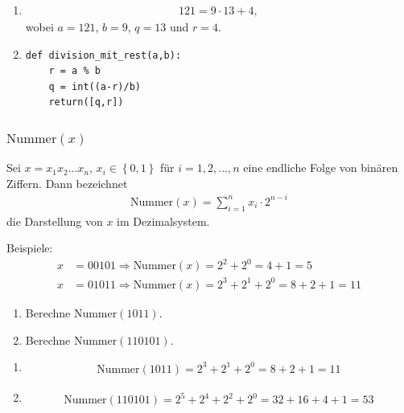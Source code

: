 \begin{Answer}%

\begin{enumerate}[label=(\alph*)]
    \item \begin{align*}
    121 = 9\cdot 13 + 4,
\end{align*}
wobei $a = 121$, $b = 9$, $q = 13$ und $r = 4$.
    \item \begin{verbatim}
def division_mit_rest(a,b):
    r = a % b
    q = int((a-r)/b)
    return([q,r])
\end{verbatim}
\end{enumerate}
\end{Answer}


\subsubsection{$\text{Nummer}(x)$}
Sei $x=x_1x_2...x_n$, $x_i\in\left\{0,1\right\}$ für $i=1,2,...,n$ eine endliche Folge von binären Ziffern. Dann bezeichnet 
\begin{align}
    \text{Nummer}(x)=\displaystyle\sum_{i=1}^n x_i\cdot 2^{n-i}
\end{align}
die Darstellung von $x$ im Dezimalsystem.

Beispiele:
\begin{align*}
    x &= 00101 \Rightarrow \text{Nummer}(x) = 2^2 + 2^0 = 4 + 1 = 5\\
    x &= 01011 \Rightarrow \text{Nummer}(x) = 2^3 + 2^1  + 2^0 = 8+ 2 + 1 = 11
\end{align*}
\begin{Exercise}%

\begin{enumerate}[label=(\alph*)]
    \item Berechne $\text{Nummer}(1011)$.
    \item Berechne $\text{Nummer}(110101)$.
\end{enumerate}
\end{Exercise}

\begin{Answer}
\begin{enumerate}[label=(\alph*)]
    \item \begin{align*}
    \text{Nummer}(1011) = 2^3 + 2^1 + 2^0 = 8 + 2 + 1 = 11
\end{align*}
    \item \begin{align*}
    \text{Nummer}(110101) = 2^5 + 2^4 + 2^2 + 2^0 = 32 + 16 + 4 + 1 = 53
\end{align*}
\end{enumerate}
\end{Answer}


